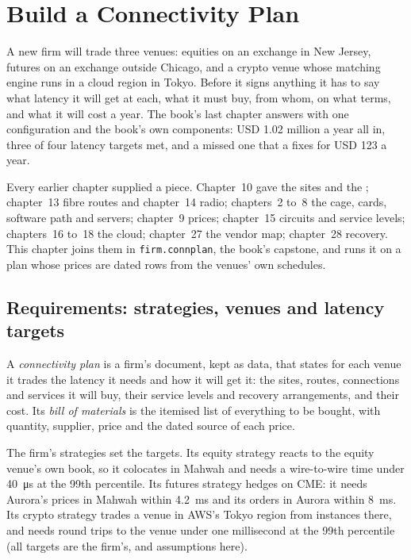 \chapter{Build a Connectivity Plan}\label{ch:nw:build-a-connectivity-plan}

A new firm will trade three venues: equities on an exchange in New Jersey, futures on an exchange outside Chicago, and a crypto
venue whose matching engine runs in a cloud region in Tokyo. Before it signs anything it has to say what latency it will get at
each, what it must buy, from whom, on what terms, and what it will cost a year. The book's last chapter answers with one
configuration and the book's own components: USD 1.02 million a year all in, three of four latency targets met, and a missed
one that a  fixes for USD 123 a year.

Every earlier chapter supplied a piece. Chapter~10 gave the sites and the ; chapter~13 fibre routes and chapter~14
radio; chapters~2 to~8 the cage, cards, software path and servers; chapter~9  prices; chapter~15 circuits and service
levels; chapters~16 to~18 the cloud; chapter~27 the vendor map; chapter~28 recovery. This chapter joins them in
\texttt{firm.connplan}, the book's capstone, and runs it on a plan whose prices are dated rows from the venues' own schedules.

\section{Requirements: strategies, venues and latency targets}

\begin{definition}\label{def:nw:build-a-connectivity-plan:plan}
A \emph{connectivity plan} is a firm's document, kept as data, that states for each venue it trades the
latency it needs and how it will get it: the sites, routes, connections and services it will buy, their service levels and
recovery arrangements, and their cost. Its \emph{bill of materials} is the itemised list of everything to
be bought, with quantity, supplier, price and the dated source of each price.
\end{definition}

The firm's strategies set the targets. Its equity strategy reacts to the equity venue's own book, so it colocates in Mahwah and
needs a wire-to-wire time under \qty{40}{\micro\second} at the 99th percentile. Its futures strategy hedges on CME: it needs Aurora's
prices in Mahwah within \qty{4.2}{\milli\second} and its orders in Aurora within \qty{8}{\milli\second}. Its crypto strategy trades a
venue in AWS's Tokyo region from instances there, and needs round trips to the venue under one millisecond at the 99th percentile
(all targets are the firm's, and assumptions here).

